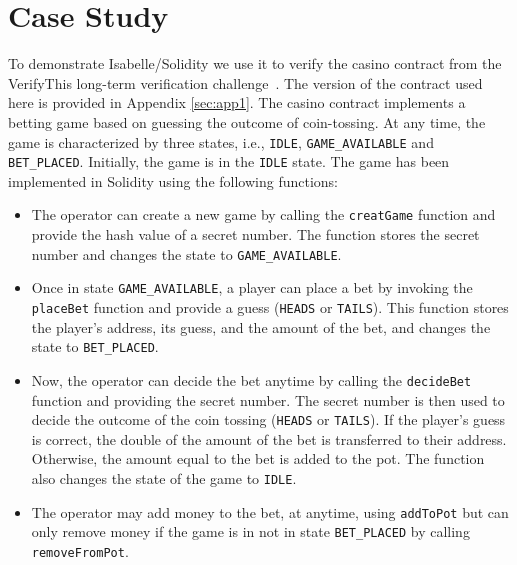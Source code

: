 \documentclass[a4paper,UKenglish,cleveref, autoref, thm-restate]{oasics-v2021}
\begin{document}
\section{Case Study}
To demonstrate Isabelle/Solidity we use it to verify the casino contract from the VerifyThis long-term verification challenge~\cite{verifythis:casino}.
The version of the contract used here is provided in Appendix \ref{sec:app1}.
%
The casino contract implements a betting game based on guessing the outcome of coin-tossing.
%
At any time, the game is characterized by three states, i.e., \texttt{IDLE}, \texttt{GAME\_AVAILABLE} and \texttt{BET\_PLACED}.
%
Initially, the game is in the \texttt{IDLE} state.
%
The game has been implemented in Solidity using the following functions:
%
\begin{itemize}
\item The operator can create a new game by calling the \texttt{creatGame} function and provide the hash value of a secret number.
The function stores the secret number and changes the state to \texttt{GAME\_AVAILABLE}.
%
\item Once in state \texttt{GAME\_AVAILABLE}, a player can place a bet by invoking the \texttt{placeBet} function and provide a guess (\texttt{HEADS} or \texttt{TAILS}).
This function stores the player's address, its guess, and the amount of the bet, and changes the state to \texttt{BET\_PLACED}.
%
\item Now, the operator can decide the bet anytime by calling the \texttt{decideBet} function and providing the secret number.
The secret number is then used to decide the outcome of the coin tossing (\texttt{HEADS} or \texttt{TAILS}).
If the player's guess is correct, the double of the amount of the bet is transferred to their address.
Otherwise, the amount equal to the bet is added to the pot.
The function also changes the state of the game to \texttt{IDLE}.
%
\item The operator may add money to the bet, at anytime, using \texttt{addToPot} but can only remove money if the game is in not in state \texttt{BET\_PLACED} by calling \texttt{removeFromPot}.
\end{itemize}
%
%
\end{document}
